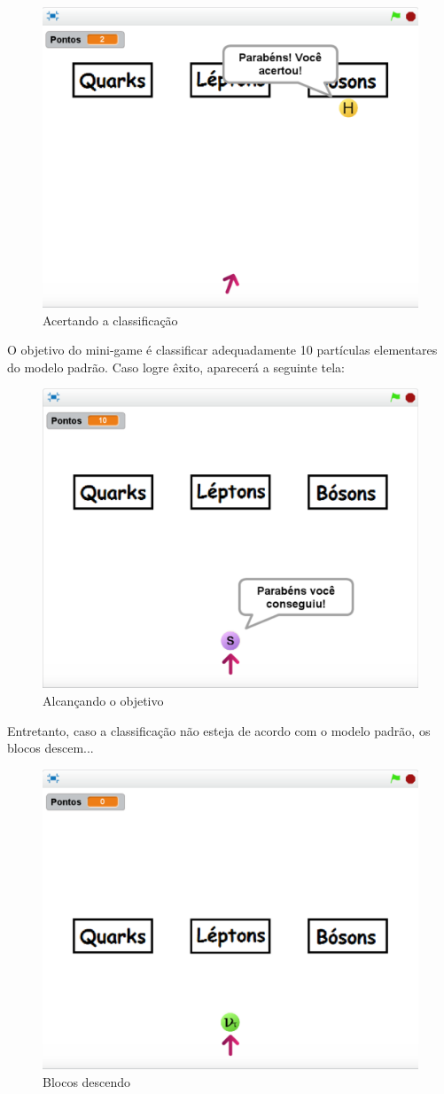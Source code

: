\documentclass[12pt,fleqn]{book} %
\begin{document}
\begin{figure}[h]
	\centering
	\includegraphics[width=0.65 \textwidth]{Produto/class5}
	\caption{Acertando a classificação}
	\label{fig:app_a:class5}
\end{figure}

\newpage

O objetivo do mini-game é classificar adequadamente 10 partículas elementares do modelo padrão. Caso logre êxito, aparecerá a seguinte tela:

\begin{figure}[h]
	\centering
	\includegraphics[width=0.65 \textwidth]{Produto/class10}
	\caption{Alcançando o objetivo}
	\label{fig:app_a:class10}
\end{figure}

Entretanto, caso a classificação não esteja de acordo com o modelo padrão, os blocos descem...

\begin{figure}[h]
	\centering
	\includegraphics[width=0.65 \textwidth]{Produto/class4}
	\caption{Blocos descendo}
	\label{fig:app_a:class4}
\end{figure}
\end{document}
